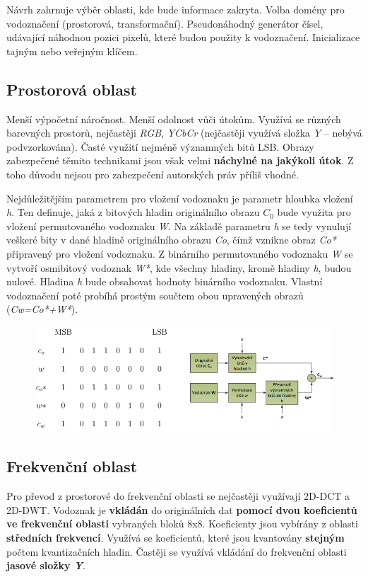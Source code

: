 Návrh zahrnuje výběr oblasti, kde bude informace zakryta. Volba domény pro vodoznačení (prostorová, transformační). Pseudonáhodný generátor čísel, udávající náhodnou pozici pixelů, které budou použity k vodoznačení. Inicializace tajným nebo veřejným klíčem.


\subsection{Prostorová oblast}

Menší výpočetní náročnost. Menší odolnost vůči útokům. Využívá se různých barevných prostorů, nejčastěji \textit{RGB}, \textit{YCbCr} (nejčastěji využívá složka \textit{Y} -- nebývá podvzorkována). Časté využití nejméně významných bitů LSB. Obrazy zabezpečené těmito technikami jsou však velmi \textbf{náchylné na jakýkoli útok}. Z toho důvodu nejsou pro zabezpečení autorských práv příliš vhodné.

Nejdůležitějším parametrem pro vložení vodoznaku je parametr hloubka
vložení \textit{h}. Ten definuje, jaká z bitových hladin originálního obrazu $C_{0}$ bude využita pro vložení permutovaného vodoznaku \textit{W}. Na základě parametru \textit{h} se tedy vynulují veškeré bity v dané hladině originálního obrazu \textit{Co}, čímž vznikne obraz \textit{Co*} připravený pro vložení vodoznaku. Z binárního permutovaného vodoznaku \textit{W} se vytvoří osmibitový vodoznak \textit{W*}, kde všechny hladiny, kromě hladiny \textit{h}, budou nulové. Hladina \textit{h} bude obsahovat hodnoty binárního vodoznaku. Vlastní vodoznačení poté probíhá prostým součtem obou upravených obrazů (\textit{Cw=Co*+W*}).

\begin{figure}[ht]
    \centering
    \includegraphics[width=0.75\linewidth]{images/fr.png}
\end{figure}
\FloatBarrier

\subsection{Frekvenční oblast}

Pro převod z prostorové do frekvenční oblasti se nejčastěji využívají 2D-DCT a 2D-DWT. Vodoznak je \textbf{vkládán} do originálních dat \textbf{pomocí dvou koeficientů ve frekvenční oblasti} vybraných bloků 8x8. Koeficienty jsou vybírány z oblasti \textbf{středních frekvencí}. Využívá se koeficientů, které jsou kvantovány \textbf{stejným} počtem kvantizačních hladin. Častěji se využívá vkládání do frekvenční oblasti \textbf{jasové složky \textit{Y}}.

